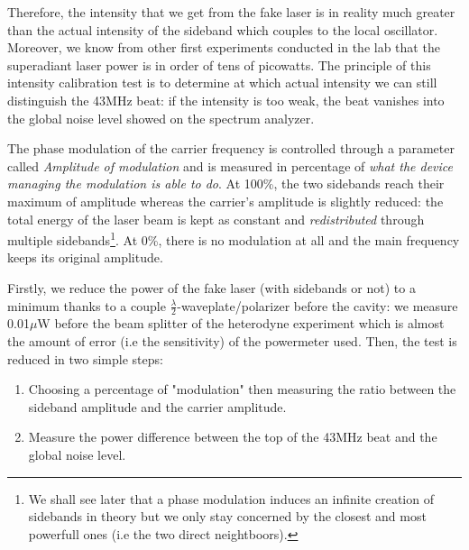 \documentclass[12pt]{report}
\begin{document}
Therefore, the intensity that we get from the fake laser is in reality much greater than the actual intensity of the sideband which couples to the local oscillator. Moreover, we know from other first experiments conducted in the lab that the superadiant laser power is in order of tens of picowatts. The principle of this intensity calibration test is to determine at which actual intensity we can still distinguish the 43MHz beat: if the intensity is too weak, the beat vanishes into the global noise level showed on the spectrum analyzer.

The phase modulation of the carrier frequency is controlled through a parameter called \textit{Amplitude of modulation} and is measured in percentage of \textit{what the device managing the modulation is able to do}. At 100\%, the two sidebands reach their maximum of amplitude whereas the carrier's amplitude is slightly reduced: the total energy of the laser beam is kept as constant and \textit{redistributed} through multiple sidebands\footnote{We shall see later that a phase modulation induces an infinite creation of sidebands in theory but we only stay concerned by the closest and most powerfull ones (i.e the two direct neightboors).}. At 0\%, there is no modulation at all and the main frequency keeps its original amplitude.

Firstly, we reduce the power of the fake laser (with sidebands or not) to a minimum thanks to a couple $\frac{\lambda}{2}$-waveplate/polarizer before the cavity: we measure 0.01$\mu$W before the beam splitter of the heterodyne experiment which is almost the amount of error (i.e the sensitivity) of the powermeter used. Then, the test is reduced in two simple steps:
\begin{enumerate}
	\item Choosing a percentage of "modulation" then measuring the ratio between the sideband amplitude and the carrier amplitude.
	\item Measure the power difference between the top of the 43MHz beat and the global noise level.
\end{enumerate}
\end{document}
